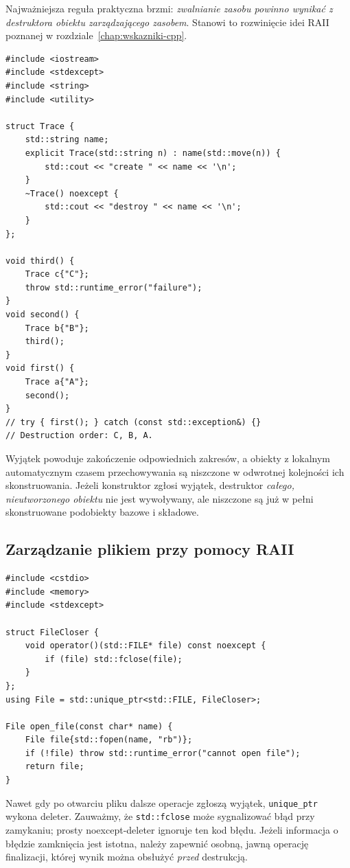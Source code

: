 Najważniejsza reguła praktyczna brzmi: \emph{zwalnianie zasobu powinno
wynikać z destruktora obiektu zarządzającego zasobem}. Stanowi to
rozwinięcie idei RAII poznanej w rozdziale~\ref{chap:wskazniki-cpp}.

\begin{lstlisting}
#include <iostream>
#include <stdexcept>
#include <string>
#include <utility>

struct Trace {
    std::string name;
    explicit Trace(std::string n) : name(std::move(n)) {
        std::cout << "create " << name << '\n';
    }
    ~Trace() noexcept {
        std::cout << "destroy " << name << '\n';
    }
};

void third() {
    Trace c{"C"};
    throw std::runtime_error("failure");
}
void second() {
    Trace b{"B"};
    third();
}
void first() {
    Trace a{"A"};
    second();
}
// try { first(); } catch (const std::exception&) {}
// Destruction order: C, B, A.
\end{lstlisting}

Wyjątek powoduje zakończenie odpowiednich zakresów, a obiekty
z lokalnym automatycznym czasem przechowywania są niszczone w odwrotnej
kolejności ich skonstruowania. Jeżeli konstruktor zgłosi wyjątek,
destruktor \emph{całego, nieutworzonego obiektu} nie jest wywoływany,
ale niszczone są już w pełni skonstruowane podobiekty bazowe i składowe.

\subsection{Zarządzanie plikiem przy pomocy RAII}

\begin{lstlisting}
#include <cstdio>
#include <memory>
#include <stdexcept>

struct FileCloser {
    void operator()(std::FILE* file) const noexcept {
        if (file) std::fclose(file);
    }
};
using File = std::unique_ptr<std::FILE, FileCloser>;

File open_file(const char* name) {
    File file{std::fopen(name, "rb")};
    if (!file) throw std::runtime_error("cannot open file");
    return file;
}
\end{lstlisting}

Nawet gdy po otwarciu pliku dalsze operacje zgłoszą wyjątek,
\texttt{unique\_ptr} wykona deleter. Zauważmy, że
\texttt{std::fclose} może sygnalizować błąd przy zamykaniu; prosty
noexcept-deleter ignoruje ten kod błędu. Jeżeli informacja o błędzie
zamknięcia jest istotna, należy zapewnić osobną, jawną operację
finalizacji, której wynik można obsłużyć \emph{przed} destrukcją.

